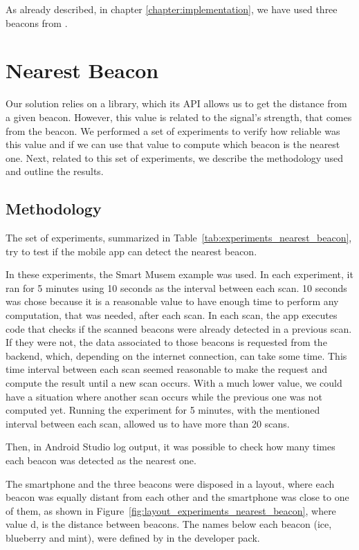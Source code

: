 As already described, in chapter \ref{chapter:implementation}, we have used three beacons from .

\section{Nearest Beacon}
\label{sec:evaluation_nearest_beacon}
Our solution relies on a library, which its \gls{API} allows us to get the distance from a given beacon.
However, this value is related to the signal's strength, that comes from the beacon.
We performed a set of experiments to verify how reliable was this value and if we can use that value to compute which beacon is the nearest one.
Next, related to this set of experiments, we describe the methodology used and outline the results.

\subsection{Methodology}
\label{sub:evaluation_nearest_beacon_methodology}
The set of experiments, summarized in Table~\ref{tab:experiments_nearest_beacon}, try to test if the mobile app can detect the nearest beacon.



In these experiments, the Smart Musem example was used.
In each experiment, it ran for 5 minutes using 10 seconds as the interval between each scan.
10 seconds was chose because it is a reasonable value to have enough time to perform any computation, that was needed, after each scan.
In each scan, the app executes code that checks if the scanned beacons were already detected in a previous scan. If they were not, the data associated to those beacons is requested from the backend, which, depending on the internet connection, can take some time.
This time interval between each scan seemed reasonable to make the request and compute the result until a new scan occurs.
With a much lower value, we could have a situation where another scan occurs while the previous one was not computed yet.
Running the experiment for 5 minutes, with the mentioned interval between each scan, allowed us to have more than 20 scans.

Then, in Android Studio log output, it was possible to check how many times each beacon was detected as the nearest one.

The smartphone and the three beacons were disposed in a layout, where each beacon was equally distant from each other and the smartphone was close to one of them, as shown in Figure~\ref{fig:layout_experiments_nearest_beacon}, where value d, is the distance between beacons.
The names below each beacon (ice, blueberry and mint), were defined by  in the developer pack.

